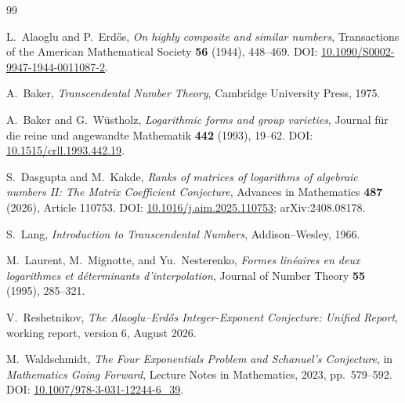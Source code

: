 \documentclass[11pt,oneside]{article}
\theoremstyle{definition}
\theoremstyle{remark}
\begin{document}
\begin{thebibliography}{99}

L.~Alaoglu and P.~Erd\H{o}s,
\newblock \emph{On highly composite and similar numbers},
\newblock Transactions of the American Mathematical Society \textbf{56} (1944), 448--469.
\newblock DOI: \href{https://doi.org/10.1090/S0002-9947-1944-0011087-2}{10.1090/S0002-9947-1944-0011087-2}.

A.~Baker,
\newblock \emph{Transcendental Number Theory},
\newblock Cambridge University Press, 1975.

A.~Baker and G.~W\"ustholz,
\newblock \emph{Logarithmic forms and group varieties},
\newblock Journal f\"ur die reine und angewandte Mathematik \textbf{442} (1993), 19--62.
\newblock DOI: \href{https://doi.org/10.1515/crll.1993.442.19}{10.1515/crll.1993.442.19}.

S.~Dasgupta and M.~Kakde,
\newblock \emph{Ranks of matrices of logarithms of algebraic numbers II: The Matrix
Coefficient Conjecture},
\newblock Advances in Mathematics \textbf{487} (2026), Article 110753.
\newblock DOI: \href{https://doi.org/10.1016/j.aim.2025.110753}{10.1016/j.aim.2025.110753};
arXiv:2408.08178.

S.~Lang,
\newblock \emph{Introduction to Transcendental Numbers},
\newblock Addison--Wesley, 1966.

M.~Laurent, M.~Mignotte, and Yu.~Nesterenko,
\newblock \emph{Formes lin\'eaires en deux logarithmes et d\'eterminants d'interpolation},
\newblock Journal of Number Theory \textbf{55} (1995), 285--321.

V.~Reshetnikov,
\newblock \emph{The Alaoglu--Erd\H{o}s Integer-Exponent Conjecture: Unified Report},
\newblock working report, version 6, August 2026.

M.~Waldschmidt,
\newblock \emph{The Four Exponentials Problem and Schanuel's Conjecture},
\newblock in \emph{Mathematics Going Forward}, Lecture Notes in Mathematics, 2023,
pp.~579--592.
\newblock DOI: \href{https://doi.org/10.1007/978-3-031-12244-6_39}{10.1007/978-3-031-12244-6\_39}.

\end{thebibliography}
\end{document}
